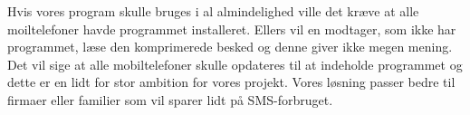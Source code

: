 Hvis vores program skulle bruges i al almindelighed ville det kræve at alle moiltelefoner havde programmet installeret. Ellers vil en modtager, som ikke har programmet, læse den komprimerede besked og denne giver ikke megen mening. Det vil sige at alle mobiltelefoner skulle opdateres til at indeholde programmet og dette er en lidt for stor ambition for vores projekt. Vores løsning passer bedre til firmaer eller familier som vil sparer lidt på SMS-forbruget. 